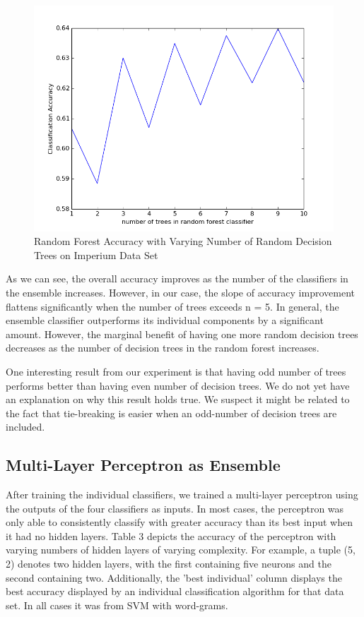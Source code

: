 \documentclass[11pt]{article}
\begin{document}
\begin{figure}[h!]
    \centering
    \includegraphics[scale=0.5]{RF_50run_imperium.png}
    \caption{Random Forest Accuracy with Varying Number of Random Decision Trees on Imperium Data Set}
    \label{fig:my_label}
\end{figure}

As we can see, the overall accuracy improves as the number of the classifiers
in the ensemble increases. However, in our case, the slope of accuracy
improvement flattens significantly when the number of trees exceeds n = 5. In
general, the ensemble classifier outperforms its individual components by a
significant amount. However, the marginal benefit of having one more random
decision trees decreases as the number of decision trees in the random forest
increases.

One interesting result from our experiment is that having odd number of trees
performs better than having even number of decision trees. We do not yet have
an explanation on why this result holds true. We suspect it might be related to
the fact that tie-breaking is easier when an odd-number of decision trees are
included.

\subsection{Multi-Layer Perceptron as Ensemble}

After training the individual classifiers, we trained a multi-layer perceptron
using the outputs of the four classifiers as inputs. In most cases, the
perceptron was only able to consistently classify with greater accuracy than
its best input when it had no hidden layers. Table 3 depicts the accuracy of
the perceptron with varying numbers of hidden layers of varying complexity. For
example, a tuple (5, 2) denotes two hidden layers, with the first containing
five neurons and the second containing two.  Additionally, the 'best
individual' column displays the best accuracy displayed by an individual
classification algorithm for that data set. In all cases it was from SVM with
word-grams.
\end{document}
